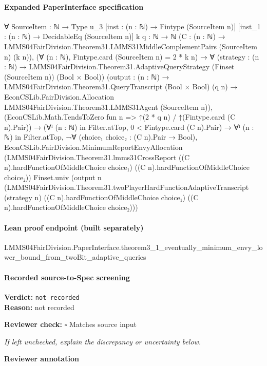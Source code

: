 \documentclass[10pt]{article}
\newcommand{\reviewerbox}{%
  \par\noindent\fbox{\parbox{0.96\linewidth}{\rule{0pt}{0.38in}}}\par
}
\newcommand{\reviewmatch}[1]{%
  \par\noindent\textbf{Reviewer check:} $\square$\; #1\par
  \noindent\emph{If left unchecked, explain the discrepancy or uncertainty below.}\par
}
\begin{document}
\paragraph{Expanded PaperInterface specification}
\begin{ReviewVerbatim}
∀ {SourceItem : ℕ → Type u_3} [inst : (n : ℕ) → Fintype (SourceItem n)] [inst_1 : (n : ℕ) → DecidableEq (SourceItem n)]
  {k q : ℕ → ℕ} (C : (n : ℕ) → LMMS04FairDivision.Theorem31.LMMS31MiddleComplementPairs (SourceItem n) (k n)),
  (∀ (n : ℕ), Fintype.card (SourceItem n) = 2 * k n) →
    ∀ (strategy : (n : ℕ) → LMMS04FairDivision.Theorem31.AdaptiveQueryStrategy (Finset (SourceItem n)) (Bool × Bool))
      (output :
        (n : ℕ) →
          LMMS04FairDivision.Theorem31.QueryTranscript (Bool × Bool) (q n) →
            EconCSLib.FairDivision.Allocation LMMS04FairDivision.Theorem31.LMMS31Agent (SourceItem n)),
      (EconCSLib.Math.TendsToZero fun n => ↑(2 * q n) / ↑(Fintype.card (C n).Pair)) →
        (∀ᶠ (n : ℕ) in Filter.atTop, 0 < Fintype.card (C n).Pair) →
          ∀ᶠ (n : ℕ) in Filter.atTop,
            ¬∀ (choice₁ choice₂ : (C n).Pair → Bool),
                EconCSLib.FairDivision.MinimumReportEnvyAllocation
                  (LMMS04FairDivision.Theorem31.lmms31CrossReport ((C n).hardFunctionOfMiddleChoice choice₁)
                    ((C n).hardFunctionOfMiddleChoice choice₂))
                  Finset.univ
                  (output n
                    (LMMS04FairDivision.Theorem31.twoPlayerHardFunctionAdaptiveTranscript (strategy n)
                      ((C n).hardFunctionOfMiddleChoice choice₁) ((C n).hardFunctionOfMiddleChoice choice₂)))
\end{ReviewVerbatim}

\paragraph{Lean proof endpoint (built separately)}\begin{ReviewVerbatim}
LMMS04FairDivision.PaperInterface.theorem3_1_eventually_minimum_envy_lower_bound_from_twoBit_adaptive_queries
\end{ReviewVerbatim}

\paragraph{Recorded source-to-Spec screening}
\textbf{Verdict:} \texttt{not recorded}
\\
\textbf{Reason:} not recorded
\reviewmatch{Matches source input}
\noindent\textbf{Reviewer annotation}\par
\reviewerbox
\clearpage
\hypertarget{source-claim-8bf4d9c1af9dd508}{}
\end{document}
